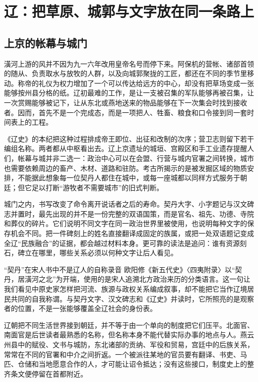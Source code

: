 \section{辽：把草原、城郭与文字放在同一条路上}

\subsection{上京的帐幕与城门}

潢河上游的风并不因为九一六年改用皇帝名号而停下来。阿保机的营帐、诸部首领的随从、负责取水与放牧的人群，以及向城郭聚拢的工匠，都还在不同的季节里移动。称帝的礼仪为权力增加了一个可以传达给远方的中心，却没有把草场变成一张能够按州县分格的纸。辽初最难的工作，是让一支被召集的军队能够再被召集，让一次赏赐能够被记下，让从东北或燕地送来的物品能够在下一次集会时找到接收者。因而，首先不是一个完成态，而是一项把人、牲畜、粮食和口令接到同一套时间表上的工程。

《辽史》的本纪把这种过程排成帝王即位、出征和改制的次序；营卫志则留下若干编组名称。两者都从中枢看出去。辽上京遗址的城垣、宫殿区和手工业遗存提醒人们，帐幕与城并非二选一：政治中心可以在会盟、行营与城内官署之间转换，城市也需要依赖周边的畜产、木材、道路和驻防。考古所揭示的是被发掘区域的物质安排，不能据此想象每一位契丹人都住在城中，或每一座城都以同样方式服务于朝廷；但它足以打断“游牧者不需要城市”的旧式判断。

城门之内，书写改变了命令离开说话者之后的寿命。契丹大字、小字题记与汉文碑志并置时，最先出现的并不是一份完整的双语国策，而是官名、祖先、功德、寺院和葬仪的碎片。它们说明不同文字在同一政治世界里被使用，也说明每种文字的保存机会不同。把一件碑刻上的姓名直接翻译成固定的族属，或把一处双语题记变成全辽“民族融合”的证据，都会越过材料本身。更可靠的读法是追问：谁有资源刻石，碑立在哪里，哪些关系必须以何种文字让后人看见。

\begin{textwindow}{“契丹”在宋人书中不是辽人的自称录音}
欧阳修《新五代史》〈四夷附录〉以“契丹，居潢河之北”为开端，使用的是宋人追溯北方政治来历的分类语言。这一句让我们看见中原史家怎样把河流、族源与政权关系编成叙事，却不能把它当作辽境居民共同的自我称谓。与契丹文字、汉文碑志和《辽史》并读时，它所照亮的是观察者的位置，不是一张能够覆盖全辽社会的身份表。
\end{textwindow}

辽朝把不同生活世界接到朝廷，并不等于由一个单向的制度把它们压平。北面官、南面官是后世读者最熟悉的名称，但名称本身不能代替实际办事的地点与人。燕云州县中的赋役、文书与城防，东北诸部的贡纳、军役和贸易，宫廷中的后族关系，常常在不同的官署和中介之间折返。一个被派往某地的官员要有翻译、书吏、马匹、仓储和当地愿意合作的人，才可能让诏令抵达；没有这些接口，制度史上的整齐条文便停留在首都附近。

